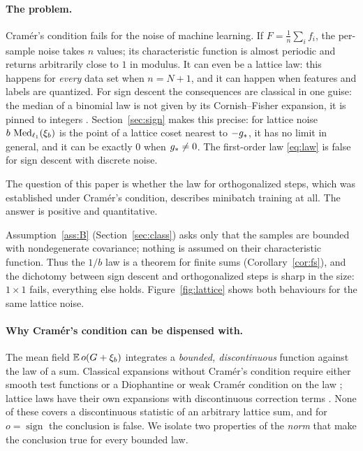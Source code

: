 \documentclass[anon,12pt]{colt2026}
\begin{document}
\paragraph{The problem.} Cram\'er's condition fails for the noise of machine learning. If $F=\frac1n\sum_if_i$, the
per-sample noise takes $n$ values; its characteristic function is almost periodic and returns arbitrarily close to
$1$ in modulus. It can even be a lattice law: this happens for \emph{every} data set when $n=N+1$, and it can happen when
features and labels are quantized. For sign descent the consequences are classical in one guise: the median of a
binomial law is not given by its Cornish--Fisher expansion, it is pinned to integers
\citep{kaas,hamza}. Section~\ref{sec:sign} makes this precise: for lattice noise $b\,\operatorname{Med}_{\ell_1}(\xi_b)$ is the point of a
lattice coset nearest to $-g_\ast$, it has no limit in general, and it can be exactly $0$ when $g_\ast\ne0$. The
first-order law \eqref{eq:law} is false for sign descent with discrete noise.

The question of this paper is whether the law for orthogonalized steps, which was established under Cram\'er's
condition, describes minibatch training at all. The answer is positive and quantitative.

\begin{theorem}\label{thm:nuclear}\StmtNuclear\end{theorem}

Assumption~\ref{ass:B} (Section~\ref{sec:class}) asks only that the samples are bounded with nondegenerate
covariance; nothing is assumed on their characteristic function. Thus the $1/b$ law is a theorem for finite sums
(Corollary~\ref{cor:fs}), and the dichotomy between sign descent and orthogonalized steps is sharp in the size:
$1\times1$ fails, everything else holds. Figure~\ref{fig:lattice} shows both behaviours for the same lattice noise.

\paragraph{Why Cram\'er's condition can be dispensed with.} The mean field $\mathbb{E}\,o(G+\xi_b)$ integrates a
\emph{bounded, discontinuous} function against the law of a sum. Classical expansions without Cram\'er's condition
require either smooth test functions \citep{gh,br} or a Diophantine or weak Cram\'er condition on the law
\citep{breuillard,angstpoly,song}; lattice laws have their own expansions with discontinuous correction terms
\citep{esseen,br,bggh,df}. None of these covers a discontinuous statistic of an arbitrary lattice sum, and for $o=\operatorname{sign}$
the conclusion is false. We isolate two properties of the \emph{norm} that make the conclusion true for every bounded
law.
\end{document}
